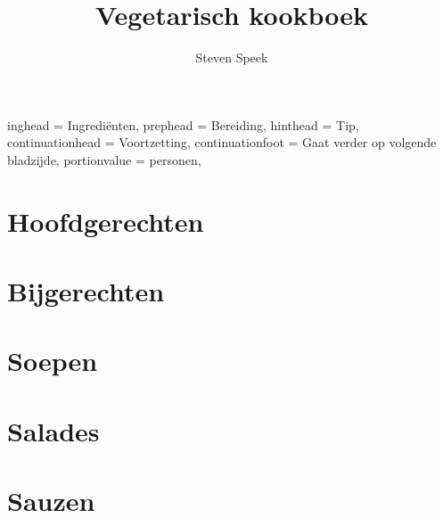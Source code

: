 \documentclass[%
a4paper,
12pt
]{article}
\begin{document}
\title{Vegetarisch kookboek}
\author{Steven Speek}
\maketitle

\tableofcontents

\setHeadlines
{%
    inghead = Ingredi\"{e}nten,
    prephead = Bereiding,
    hinthead = Tip,
    continuationhead = Voortzetting,
    continuationfoot = Gaat verder op volgende bladzijde,
    portionvalue = personen,
}

\section{Hoofdgerechten}







\section{Bijgerechten}


\section{Soepen}


\section{Salades}




\section{Sauzen}

\end{document}
